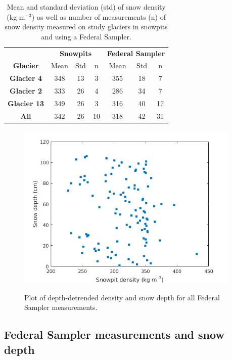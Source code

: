 \documentclass[12pt]{article}
\begin{document}
\begin{table}[b!]
\centering
\caption{Mean and standard deviation (std) of snow density (kg m$^{-3}$) as well as number of measurements (n) of snow density measured on study glaciers in snowpits and using a Federal Sampler. }
\label{tab:density_stats}
\begin{tabular}{ccccccc}
 & \multicolumn{3}{c}{\textbf{Snowpits}} & \multicolumn{3}{c}{\textbf{Federal Sampler}} \\
\multirow{-2}{*}{\textbf{Glacier}} & Mean & Std & n & Mean & Std & n \\ \hline
\textbf{Glacier 4} & 348 & 13 & 3 & 355 & 18 & 7 \\
\textbf{Glacier 2} & 333 & 26 & 4 & 286 & 34 & 7 \\
\textbf{Glacier 13} & 349 & 26 & 3 & 316 & 40 & 17 \\
\rowcolor[HTML]{EFEFEF} 
\textbf{All} & 342 & 26 & 10 & 318 & 42 & 31
\end{tabular}
\end{table}

\begin{figure}[H]%
	\centering
	\includegraphics[width =0.95\textwidth]{DepthDensity_tubeDETREND.png}\\
	\caption{Plot of depth-detrended density and snow depth for all Federal Sampler measurements.}
	\label{fig:tube_depthDETREND}
\end{figure}


\subsection{Federal Sampler measurements and snow depth}
\end{document}
